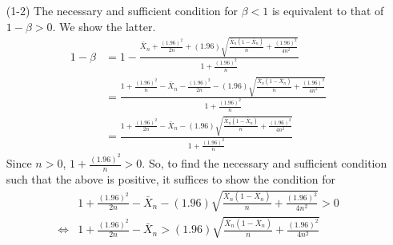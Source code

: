 \documentclass[
]{article}
\begin{document}
\begin{itemize}
\iffalse
\item[(1-1)] 
$\left[\begin{array}{l}\text { Recall that relation between roots and coefficients of a quadratic equation } \\ a x^{2}+b x+c=a(x-\alpha)(x-\beta)=0(a \neq 0) \text { : } \\ \qquad \alpha+\beta=-\frac{b}{a}, \quad \alpha \beta=\frac{c}{a}\end{array}\right]$
\newline
We see from $\left(Q E_{1}\right)$
$$
\left\{n+(1.96)^{2}\right\} p^{2}-\left\{2 n \bar{X}_{n}+(1.96)^{2}\right\} p+n\left(\bar{X}_{n}\right)^{2}=0
$$
that
$$
\alpha+\beta=\frac{2 n \bar{X}_{n}+(1.96)^{2}}{n+(1.96)^{2}}>0\left[(\because) 0 \leq \bar{X}_{n} \leq 1 \text { and }(1.96)^{2}>0\right]
$$
and
$$
\alpha \beta=\frac{n\left(\bar{X}_{n}\right)^{2}}{n+(1.96)^{2}} \geq 0, \quad\left[(\because) 0 \leq \bar{X}_{n} \leq 1\right]
$$
resulting in $\alpha \geq 0$ and $\beta>0$. Since $\alpha \beta>0$ holds if and only if $\bar{X}_{n}>0$ (or, equivalently, $\left.\bar{X}_{n} \neq 0\right)$, the required condition is $\bar{X}_{n}>0\left(\right.$ or $\left.\bar{X}_{n} \neq 0\right)$.
\fi
\item[(1-2)] 
The necessary and sufficient condition for $\beta<1$ is equivalent to that of $1-\beta > 0$. We show the latter. 
$$
\begin{aligned}
1 - \beta &= 1 - \frac{\bar{X}_{n}+\frac{(1.96)^{2}}{2 n} +(1.96) \sqrt{\frac{\bar{X}_{n}\left(1-\bar{X}_{n}\right)}{n}+\frac{(1.96)^{2}}{4 n^{2}}}}{1+\frac{(1.96)^{2}}{n}}\\
&= \frac{1 + \frac{(1.96)^2}{n} - \bar{X}_{n}-\frac{(1.96)^{2}}{2 n} -(1.96) \sqrt{\frac{\bar{X}_{n}\left(1-\bar{X}_{n}\right)}{n}+\frac{(1.96)^{2}}{4 n^{2}}}}{1+\frac{(1.96)^{2}}{n}} \\
&= \frac{1 + \frac{(1.96)^2}{2n} - \bar{X}_{n} -(1.96) \sqrt{\frac{\bar{X}_{n}\left(1-\bar{X}_{n}\right)}{n}+\frac{(1.96)^{2}}{4 n^{2}}}}{1+\frac{(1.96)^{2}}{n}}
\end{aligned}
$$
Since $n > 0$, $1+\frac{(1.96)^{2}}{n} > 0$. So, to find the necessary and sufficient condition such that the above is positive, it suffices to show the condition for 
\begin{align}
&1 + \frac{(1.96)^2}{2n} - \bar{X}_{n} -(1.96) \sqrt{\frac{\bar{X}_{n}\left(1-\bar{X}_{n}\right)}{n}+\frac{(1.96)^{2}}{4 n^{2}}} > 0 \\
\iff& 1 + \frac{(1.96)^2}{2n} - \bar{X}_{n} > (1.96) \sqrt{\frac{\bar{X}_{n}\left(1-\bar{X}_{n}\right)}{n}+\frac{(1.96)^{2}}{4 n^{2}}}
\end{align}


\end{itemize}
\end{document}
